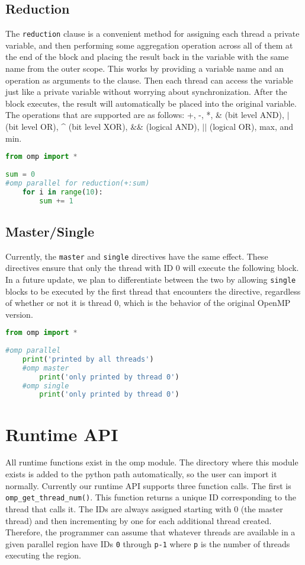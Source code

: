 \documentclass[letterpaper,12pt]{article} %
\begin{document}
\subsection{Reduction} 
The \texttt{reduction} clause is a convenient method for assigning each thread a private variable, and then performing some aggregation operation across all of them at the end of the block and placing the result back in the variable with the same name from the outer scope. This works by providing a variable name and an operation as arguments to the clause. Then each thread can access the variable just like a private variable without worrying about synchronization. After the block executes, the result will automatically be placed into the original variable. The operations that are supported are as follows: +, -, *, \& (bit level AND), $|$ (bit level OR), \^{} (bit level XOR), \&\& (logical AND), $||$ (logical OR), max, and min.

\begin{lstlisting}[language=Python]
from omp import *
 
sum = 0
#omp parallel for reduction(+:sum)
	for i in range(10):
		sum += 1
\end{lstlisting}



 \subsection{Master/Single}
 Currently, the \texttt{master} and \texttt{single} directives have the same effect. These directives ensure that only the thread with ID 0 will execute the following block. In a future update, we plan to differentiate between the two by allowing \texttt{single} blocks to be executed by the first thread that encounters the directive, regardless of whether or not it is thread 0, which is the behavior of the original OpenMP version.
 
 \begin{lstlisting}[language=Python]
from omp import *
 
#omp parallel
	print('printed by all threads')
	#omp master
		print('only printed by thread 0')
	#omp single
		print('only printed by thread 0')
\end{lstlisting}
 
 \section{Runtime API}
All runtime functions exist in the omp module. The directory where this module exists is added to the python path automatically, so the user can import it normally. Currently our runtime API supports three function calls. The first is \texttt{omp\_get\_thread\_num()}. This function returns a unique ID corresponding to the thread that calls it. The IDs are always assigned starting with 0 (the master thread) and then incrementing by one for each additional thread created. Therefore, the programmer can assume that whatever threads are available in a given parallel region have IDs \texttt{0} through \texttt{p-1} where \texttt{p} is the number of threads executing the region.
\end{document}
